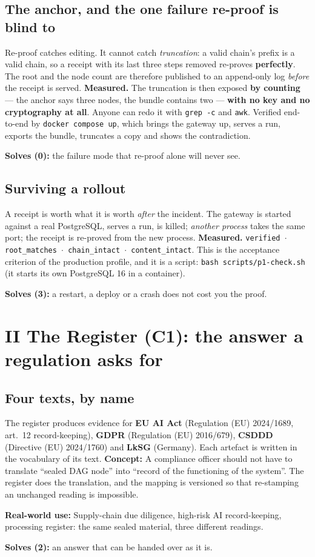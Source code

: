 \documentclass[11pt]{article}
\newcommand{\mesure}[1]{{\color{efeteal}\textbf{Measured.} }#1\par}
\newcommand{\concept}[1]{{\color{efenavy}\textbf{Concept:} }#1\par}
\newcommand{\utilite}[1]{{\color{efeplum}\textbf{Real-world use:} }#1\par}
\newcommand{\solves}[2]{{\color{efesolve}\textbf{Solves #1:} }#2\par}
\begin{document}
\subsection{The anchor, and the one failure re-proof is blind to}
Re-proof catches editing. It cannot catch \emph{truncation}: a valid chain's prefix is a valid
chain, so a receipt with its last three steps removed re-proves \textbf{perfectly}. The root and the
node count are therefore published to an append-only log \emph{before} the receipt is served.
\mesure{The truncation is then exposed \textbf{by counting} --- the anchor says three nodes, the
bundle contains two --- \textbf{with no key and no cryptography at all}. Anyone can redo it with
\texttt{grep -c} and \texttt{awk}. Verified end-to-end by \texttt{docker compose up}, which brings
the gateway up, serves a run, exports the bundle, truncates a copy and shows the contradiction.}
\solves{(0)}{the failure mode that re-proof alone will never see.}

\subsection{Surviving a rollout}
A receipt is worth what it is worth \emph{after} the incident. The gateway is started against a real
PostgreSQL, serves a run, is killed; \emph{another process} takes the same port; the receipt is
re-proved from the new process.
\mesure{\texttt{verified $\cdot$ root\_matches $\cdot$ chain\_intact $\cdot$ content\_intact}.
This is the acceptance criterion of the production profile, and it is a script:
\texttt{bash scripts/p1-check.sh} (it starts its own PostgreSQL 16 in a container).}
\solves{(3)}{a restart, a deploy or a crash does not cost you the proof.}

\section{II \;\textbar\; The Register (C1): the answer a regulation asks for}

\subsection{Four texts, by name}
The register produces evidence for \textbf{EU AI Act} (Regulation (EU) 2024/1689, art.~12
record-keeping), \textbf{GDPR} (Regulation (EU) 2016/679), \textbf{CSDDD} (Directive (EU) 2024/1760)
and \textbf{LkSG} (Germany). Each artefact is written in the vocabulary of its text.
\concept{A compliance officer should not have to translate ``sealed DAG node'' into ``record of the
functioning of the system''. The register does the translation, and the mapping is versioned so that
re-stamping an unchanged reading is impossible.}
\utilite{Supply-chain due diligence, high-risk AI record-keeping, processing register: the same
sealed material, three different readings.}
\solves{(2)}{an answer that can be handed over as it is.}
\end{document}

